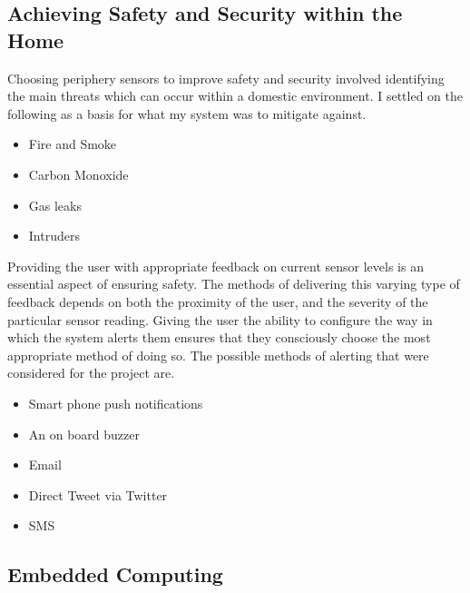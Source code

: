 \documentclass{article}
\begin{document}
\subsection{Achieving Safety and Security within the Home}
Choosing periphery sensors to improve safety and security involved identifying the main threats which can occur within a domestic environment. I settled on the following as a basis for what my system was to mitigate against.

\begin{itemize}
  \item Fire and Smoke
  \item Carbon Monoxide
  \item Gas leaks
  \item Intruders 
\end{itemize}

Providing the user with appropriate feedback on current sensor levels is an essential aspect of ensuring safety. The methods of delivering this varying type of feedback depends on both the proximity of the user, and the severity of the particular sensor reading. Giving the user the ability to configure the way in which the system alerts them ensures that they consciously choose the most appropriate method of doing so. The possible methods of alerting that were considered for the project are.

\begin{itemize}
  \item Smart phone push notifications
  \item An on board buzzer
  \item Email	
  \item Direct Tweet via Twitter
  \item SMS 
\end{itemize}

\subsection{Embedded Computing}
\end{document}
